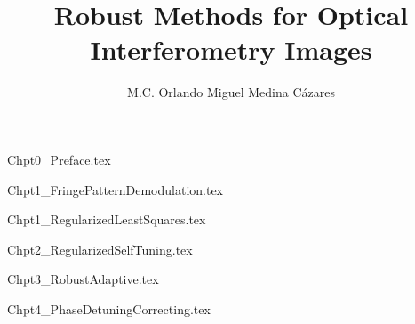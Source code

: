 \documentclass[letterpaper,12pt]{book}
\title{Robust Methods for Optical Interferometry Images}
\author{M.C. Orlando Miguel Medina C\'azares}
\begin{document}
\maketitle

\clearpage
\thispagestyle{empty}

\tableofcontents
{}
\listoffigures

\mainmatter

{Chpt0_Preface.tex}

{Chpt1_FringePatternDemodulation.tex}

{Chpt1_RegularizedLeastSquares.tex}

{Chpt2_RegularizedSelfTuning.tex}

{Chpt3_RobustAdaptive.tex}

{Chpt4_PhaseDetuningCorrecting.tex}

\medskip

\end{document}
